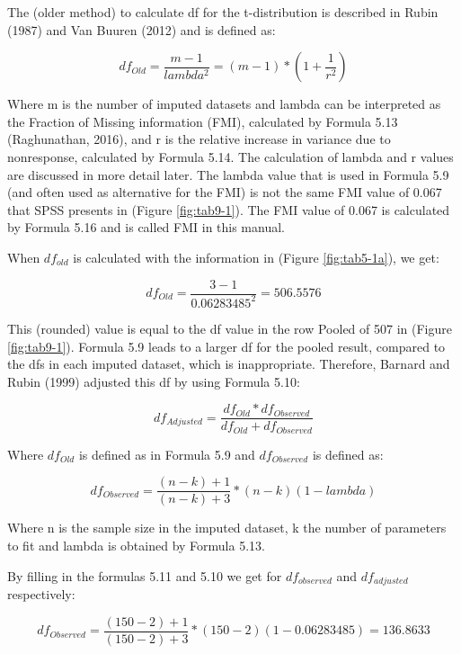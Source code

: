 \documentclass[]{book}
\theoremstyle{definition}
\theoremstyle{definition}
\theoremstyle{definition}
\theoremstyle{remark}
\begin{document}
The (older method) to calculate df for the t-distribution is described
in Rubin (1987) and Van Buuren (2012) and is defined as:

\begin{equation}
df_{Old} = \frac{m-1}{lambda^2} = (m-1) * (1 + \frac{1}{r^2})
  \label{eq:df-old}
\end{equation}

Where m is the number of imputed datasets and lambda can be interpreted
as the Fraction of Missing information (FMI), calculated by Formula 5.13
(Raghunathan, 2016), and r is the relative increase in variance due to
nonresponse, calculated by Formula 5.14. The calculation of lambda and r
values are discussed in more detail later. The lambda value that is used
in Formula 5.9 (and often used as alternative for the FMI) is not the
same FMI value of 0.067 that SPSS presents in (Figure \ref{fig:tab9-1}).
The FMI value of 0.067 is calculated by Formula 5.16 and is called FMI
in this manual.

When \(df_{old}\) is calculated with the information in (Figure
\ref{fig:tab5-1a}), we get:

\[df_{Old} = \frac{3-1}{0.06283485^2} = 506.5576\]

This (rounded) value is equal to the df value in the row Pooled of 507
in (Figure \ref{fig:tab9-1}). Formula 5.9 leads to a larger df for the
pooled result, compared to the dfs in each imputed dataset, which is
inappropriate. Therefore, Barnard and Rubin (1999) adjusted this df by
using Formula 5.10:

\begin{equation}
df_{Adjusted} = \frac{df_{Old}*{df_{Observed}}}{df_{Old}+{df_{Observed}}}
  \label{eq:df-adj}
\end{equation}

Where \(df_{Old}\) is defined as in Formula 5.9 and \(df_{Observed}\) is
defined as:

\begin{equation}
df_{Observed} = \frac{(n-k)+1}{(n-k)+3}*(n-k)(1-lambda)
  \label{eq:df-obs}
\end{equation}

Where n is the sample size in the imputed dataset, k the number of
parameters to fit and lambda is obtained by Formula 5.13.

By filling in the formulas 5.11 and 5.10 we get for \(df_{observed}\)
and \(df_{adjusted}\) respectively:

\[df_{Observed} = \frac{(150-2)+1}{(150-2)+3}*(150-2)(1- 0.06283485)=136.8633\]
\end{document}
